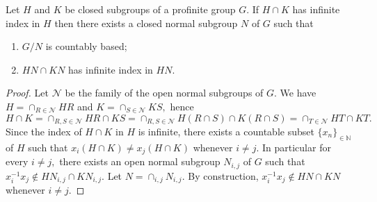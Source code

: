 \documentclass{amsart}
\DeclareMathOperator{\nil}{\mathcal N}
\newtheorem{thm}{Theorem}
\numberwithin{equation}{section}
\begin{document}
\begin{lemma}\label{intersecochiusi}Let $H$ and $K$ be closed subgroups of a profinite group $G$. If $H\cap K$ has infinite index in $H$ then there exists a closed normal subgroup $N$ of $G$ such that
\begin{enumerate}
\item $G/N$ is countably based;
\item $HN \cap KN$ has infinite index in $HN.$
\end{enumerate}
\end{lemma}
\begin{proof}
Let $\mathcal N$ be the family of the open normal subgroups of $G$. We have $H=\cap_{R\in \mathcal N}HR$ and $K=\cap_{S\in \mathcal N}KS,$
hence $$H \cap K=\cap_{R,S \in \mathcal N}HR\cap KS=\cap_{R,S\in \mathcal N}H(R\cap S) \cap K(R\cap S)=\cap_{T\in \mathcal N}HT\cap KT.$$
Since the index of $H\cap K$ in $H$ is infinite, there exists a countable subset $\{x_n\}_{\in \mathbb N}$ of $H$ such that $x_i(H\cap K) \neq x_j(H\cap K)$ whenever $i\neq j.$ In particular
for every $i\neq j,$ there exists an open normal subgroup $N_{i,j}$ of $G$ such that $x_i^{-1}x_j\notin HN_{i,j}\cap KN_{i,j}.$ Let $N=\cap_{i,j}N_{i,j}.$ By construction, $x_i^{-1}x_j\notin HN\cap KN$ whenever $i\neq j$.
\end{proof}

\end{document}

